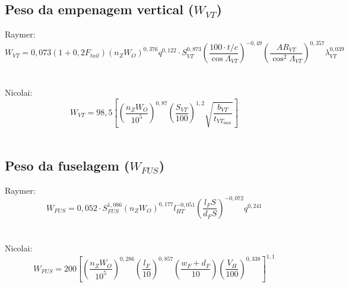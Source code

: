   \subsection{Peso da empenagem vertical ($W_{VT}$)}

    Raymer:
    \begin{equation*}
      W_{VT} = 0,073
        \left(
          1 + 0,2 F_{tail}
        \right)
        \left(
          n_Z W_O
        \right) ^ {0,376}
        q^{0,122} \cdot
        S_{VT}^{0,873}
        \left( \frac
          {100 \cdot t/c}
          {\cos \Lambda_{VT}}
        \right) ^ {-0,49}
        \left( \frac
          {{AR}_{VT}}
          {\cos ^2 \Lambda_{VT}}
        \right) ^ {0,357}
        \lambda_{VT}^{0,039}
    \end{equation*}
		\\~\\
    Nicolai:
    \begin{equation*}
      W_{VT} = 98,5 \left[
          \left( \frac
            {n_Z W_O}
            {10^5}
          \right) ^ {0,87}
          \left( \frac
            {S_{VT}}
            {100}
          \right) ^ {1,2}
          \sqrt{ \frac
            {b_{VT}}
            {t_{VT_{\max}}}
          }
        \right]
    \end{equation*}
		\\

  \subsection{Peso da fuselagem ($W_{FUS}$)}

    Raymer:
    \begin{equation*}
      W_{FUS} = 0,052 \cdot
        S_{FUS}^{1,086}
        \left(
          n_Z W_O
        \right) ^ {0,177}
        l_{HT}^{-0,051}
        \left( \frac
          {l_FS}
          {d_FS}
        \right) ^ {-0,072}
        q^{0,241}
    \end{equation*}
		\\~\\
    Nicolai:
    \begin{equation*}
      W_{FUS} = 200 \left[
        \left( \frac
          {n_Z W_O}
          {10^5}
        \right) ^ {0,286}
        \left( \frac
          {l_F}
          {10}
        \right) ^ {0,857}
        \left( \frac
          {w_F + d_F}
          {10}
        \right)
        \left( \frac
          {V_H}
          {100}
        \right) ^ {0,338}
      \right] ^ {1,1}
    \end{equation*}
		\\

